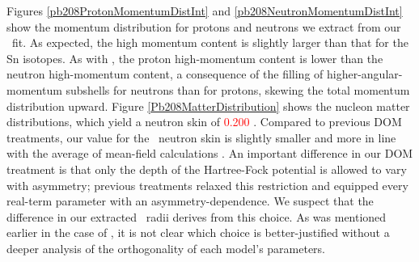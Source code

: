 Figures \ref{pb208ProtonMomentumDistInt} and \ref{pb208NeutronMomentumDistInt} show the momentum 
distribution for protons and neutrons we extract from
our \pbEight\ fit. As expected, the high momentum content is slightly larger than that for the Sn
isotopes. As with \caEight, the proton high-momentum content is lower than the
neutron high-momentum content, a consequence of the filling of
higher-angular-momentum subshells for neutrons than for protons, skewing the
total momentum distribution upward.
Figure \ref{Pb208MatterDistribution} shows the nucleon matter distributions, which yield a
neutron skin of \textcolor{red}{0.200} \femto\meter. Compared to
previous DOM treatments, our value for the
\pbEight\ neutron skin is slightly smaller and more in line with the average of mean-field
calculations \cite{Fattoyev2012}. An important difference in our DOM treatment is that only the
depth of the Hartree-Fock potential is allowed to vary with asymmetry; previous treatments
relaxed this restriction and equipped every real-term parameter with an asymmetry-dependence. We
suspect that the difference in our extracted \pbEight\ radii derives from this choice. As was
mentioned earlier in the case of \caEight, it is not clear which choice is better-justified without
a deeper analysis of the orthogonality of each model's parameters.
